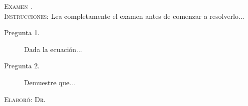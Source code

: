 \documentclass[10pt,letterpaper,spanish,twoside]{report}
\begin{document}
\docdate

\begin{center}
 \textsc{\asignatura}\vspace{.2em}
\end{center}

\textsc{Examen . }\\
\textsc{Instrucciones:} Lea completamente el examen antes de comenzar a resolverlo... 

\begin{description}
  \item[Pregunta 1.] Dada la ecuación...
  \item[Pregunta 2.] Demuestre que...
\end{description}


\vfill
\begin{flushright}
\textsc{Elaboró: Dr. \profesor}
\end{flushright}
\end{document}
